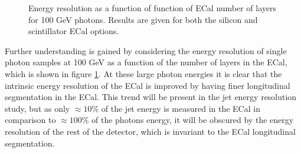 \begin{figure}
\centering
{}
\caption[Energy resolution as a function of ECal number of layers for 100 GeV photons.  Results are given for both the silicon and scintillator ECal options.]{Energy resolution as a function of function of ECal number of layers for 100 GeV photons.  Results are given for both the silicon and scintillator ECal options.}
\label{fig:ecalnlayersgamma}
\end{figure}

Further understanding is gained by considering the energy resolution of single photon samples at 100 GeV as a function of the number of layers in the ECal, which is shown in figure \ref{fig:ecalnlayersgamma}.  At these large photon energies it is clear that the intrinsic energy resolution of the ECal is improved by having finer longitudinal segmentation in the ECal.  This trend will be present in the jet energy resolution study, but as only $\approx 10\%$ of the jet energy is measured in the ECal in comparison to $\approx 100\%$ of the photons energy, it will be obscured by the energy resolution of the rest of the detector, which is invariant to the ECal longitudinal segmentation.    

